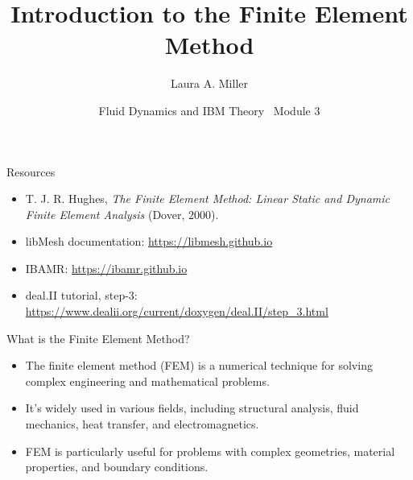 \documentclass[aspectratio=169,11pt]{beamer}
\title{Introduction to the Finite Element Method}
\author{Laura A. Miller}
\institute{Department of Mathematics, University of Arizona}
\date{Fluid Dynamics and IBM Theory \textbullet\ Module 3}
\begin{document}
\begin{frame}[plain,b]
\maketutorialtitle
\end{frame}

\begin{frame}{Resources}
  \begin{itemize}
    \item T. J. R. Hughes, \emph{The Finite Element Method: Linear Static and Dynamic Finite Element Analysis} (Dover, 2000).
    \item libMesh documentation: \url{https://libmesh.github.io}
    \item IBAMR: \url{https://ibamr.github.io}
    \item deal.II tutorial, step-3: \url{https://www.dealii.org/current/doxygen/deal.II/step_3.html}
  \end{itemize}
\end{frame}

\begin{frame}{What is the Finite Element Method?}
    \begin{itemize}
        \item The finite element method (FEM) is a numerical technique for solving complex engineering and mathematical problems.
        \item It's widely used in various fields, including structural analysis, fluid mechanics, heat transfer, and electromagnetics.
        \item FEM is particularly useful for problems with complex geometries, material properties, and boundary conditions.
    \end{itemize}
\end{frame}
\end{document}
